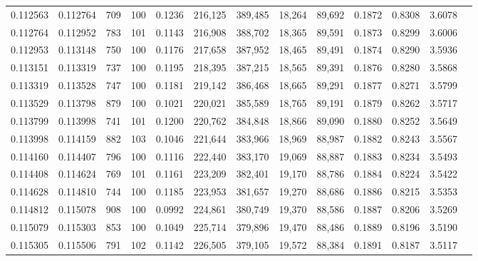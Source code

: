 \begin{tabular}{rrrrrrrrrrrrr}
0.112563 & 0.112764 &   709 & 100 &                                     0.1236 & 216,125 & 389,485 &  18,264 &  89,692 & 0.1872 & 0.8308 & 3.6078 \\
0.112764 & 0.112952 &   783 & 101 &                                     0.1143 & 216,908 & 388,702 &  18,365 &  89,591 & 0.1873 & 0.8299 & 3.6006 \\
0.112953 & 0.113148 &   750 & 100 &                                     0.1176 & 217,658 & 387,952 &  18,465 &  89,491 & 0.1874 & 0.8290 & 3.5936 \\
0.113151 & 0.113319 &   737 & 100 &                                     0.1195 & 218,395 & 387,215 &  18,565 &  89,391 & 0.1876 & 0.8280 & 3.5868 \\
0.113319 & 0.113528 &   747 & 100 &                                     0.1181 & 219,142 & 386,468 &  18,665 &  89,291 & 0.1877 & 0.8271 & 3.5799 \\
0.113529 & 0.113798 &   879 & 100 &                                     0.1021 & 220,021 & 385,589 &  18,765 &  89,191 & 0.1879 & 0.8262 & 3.5717 \\
0.113799 & 0.113998 &   741 & 101 &                                     0.1200 & 220,762 & 384,848 &  18,866 &  89,090 & 0.1880 & 0.8252 & 3.5649 \\
0.113998 & 0.114159 &   882 & 103 &                                     0.1046 & 221,644 & 383,966 &  18,969 &  88,987 & 0.1882 & 0.8243 & 3.5567 \\
0.114160 & 0.114407 &   796 & 100 &                                     0.1116 & 222,440 & 383,170 &  19,069 &  88,887 & 0.1883 & 0.8234 & 3.5493 \\
0.114408 & 0.114624 &   769 & 101 &                                     0.1161 & 223,209 & 382,401 &  19,170 &  88,786 & 0.1884 & 0.8224 & 3.5422 \\
0.114628 & 0.114810 &   744 & 100 &                                     0.1185 & 223,953 & 381,657 &  19,270 &  88,686 & 0.1886 & 0.8215 & 3.5353 \\
0.114812 & 0.115078 &   908 & 100 &                                     0.0992 & 224,861 & 380,749 &  19,370 &  88,586 & 0.1887 & 0.8206 & 3.5269 \\
0.115079 & 0.115303 &   853 & 100 &                                     0.1049 & 225,714 & 379,896 &  19,470 &  88,486 & 0.1889 & 0.8196 & 3.5190 \\
0.115305 & 0.115506 &   791 & 102 &                                     0.1142 & 226,505 & 379,105 &  19,572 &  88,384 & 0.1891 & 0.8187 & 3.5117 \\

\end{tabular}
